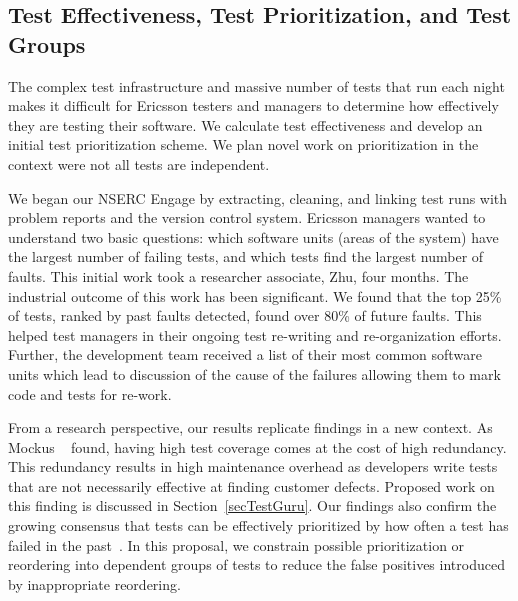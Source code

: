 \subsection{Test Effectiveness, Test Prioritization, and Test Groups}

The complex test infrastructure and massive number of tests that run each night makes it difficult for Ericsson testers and managers to determine how effectively they are testing their software. We calculate test effectiveness and develop an initial test prioritization scheme. We plan novel work on prioritization in the context were not all tests are independent.

We began our NSERC Engage by extracting, cleaning, and linking test runs with problem reports and the version control system. Ericsson managers wanted to understand two basic questions: which software units (areas of the system) have the largest number of failing tests, and which tests find the largest number of faults. 
%
This initial work took a researcher associate, Zhu, four months. The industrial outcome of this work has been significant. We found that the top 25\% of tests, ranked by past faults detected, found over 80\% of future faults.
%
%
This helped test managers in their ongoing test re-writing and re-organization efforts. Further, the development team received a list of their most common software units which lead to discussion of the cause of the failures allowing them to mark code and tests for re-work. 

From a research perspective, our results replicate findings in a new context. As Mockus \etal~\cite{Mockus2009ESEM} found, having high test coverage comes at the cost of high redundancy. This redundancy results in high maintenance overhead as developers write tests that are not necessarily effective at finding customer defects. Proposed work on this finding is discussed in Section~\ref{secTestGuru}. Our findings also confirm the growing consensus that tests can be effectively prioritized by how often a test has failed in the past~\cite{Kim2002ICSE,Hemmati}. In this proposal, we constrain possible prioritization or reordering into dependent groups of tests to reduce the false positives introduced by inappropriate reordering.

